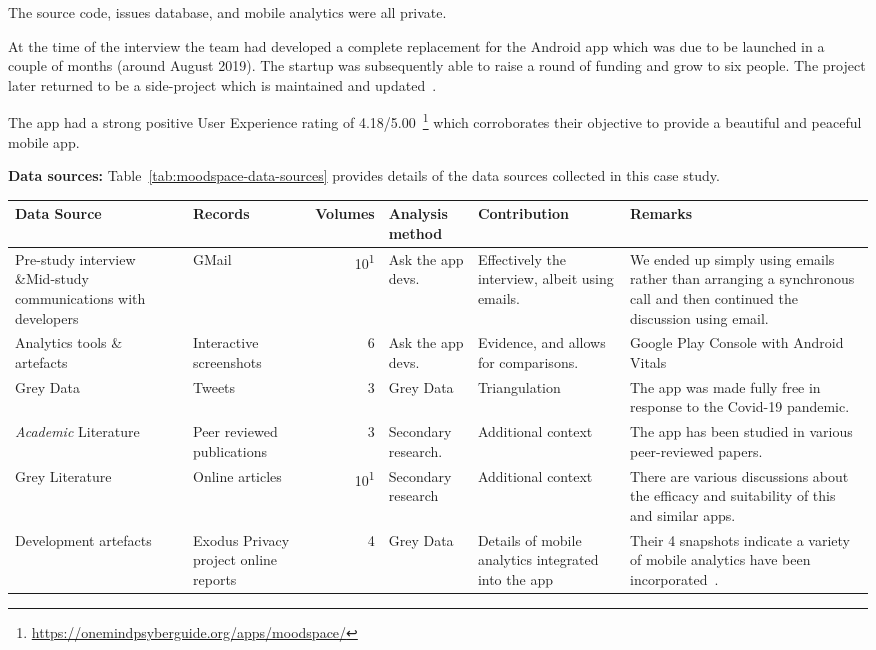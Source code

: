 The source code, issues database, and mobile analytics were all private.

At the time of the interview the team had developed a complete replacement for the Android app which was due to be launched in a couple of months (around August 2019). The startup was subsequently able to raise a round of funding and grow to six people. The project later returned to be a side-project which is maintained and updated~.

The app had a strong positive User Experience rating of 4.18/5.00~\footnote{\url{https://onemindpsyberguide.org/apps/moodspace/}} which corroborates their objective to provide a beautiful and peaceful mobile app.

\textbf{Data sources:} Table~\ref{tab:moodspace-data-sources} provides details of the data sources collected in this case study.

\begin{table*}
    \centering
    \footnotesize
    \tabcolsep=0.12cm
    \begin{tabular}{p{2.3cm}>{\raggedright}p{2.1cm}r>{\raggedright}p{2.4cm}>{\raggedright}p{2.8cm}>{\raggedright\arraybackslash}p{3.2cm}}
        Data Source & Records & Volumes & Analysis method & Contribution & Remarks \\
        \toprule
         Pre-study interview \&Mid-study communications with developers & GMail & 10\textsuperscript{1} & Ask the app devs. & Effectively the interview, albeit using emails.  & We ended up simply using emails rather than arranging a synchronous call and then continued the discussion using email.  \\
         Analytics tools \& artefacts &Interactive screenshots & 6 & Ask the app devs. & Evidence, and allows for comparisons. & Google Play Console with Android Vitals \\
         Grey Data &Tweets & 3 & Grey Data & Triangulation & The app was made fully free in response to the Covid-19 pandemic. \\
         \textit{Academic} Literature  &Peer reviewed publications & 3 & Secondary research. & Additional context & The app has been studied in various peer-reviewed papers.\footnotemark \\
         Grey Literature &Online articles & 10\textsuperscript{1} & Secondary research & Additional context & There are various discussions about the efficacy and suitability of this and similar apps. \\
         Development artefacts\footnotemark & Exodus Privacy project online reports & 4 & Grey Data & Details of mobile analytics integrated into the app & Their 4 snapshots indicate a variety of mobile analytics have been incorporated~\footnotemark. \\
         \bottomrule
    \end{tabular}
    \caption{Moodspace: data sources}
    \label{tab:moodspace-data-sources}
\end{table*}

